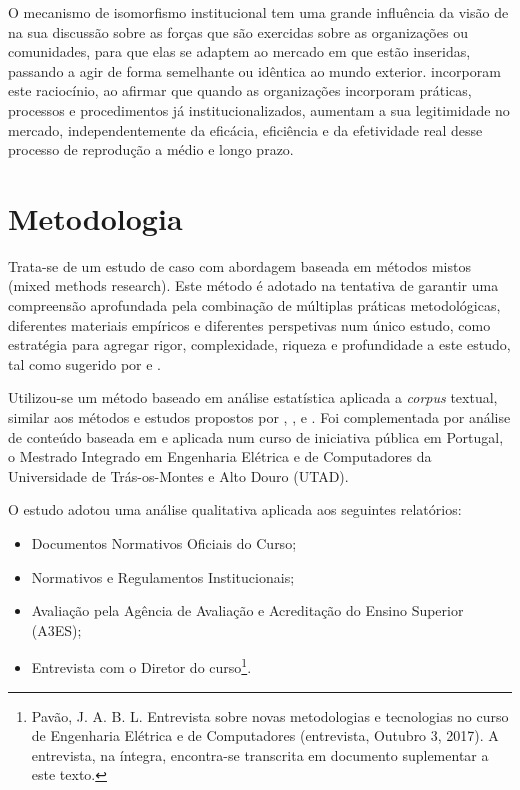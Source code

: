 \documentclass{textolivre}
\begin{document}
O mecanismo de isomorfismo institucional tem uma grande influência da visão de \textcite{kanter1972} na sua discussão sobre as forças que são exercidas sobre as organizações ou comunidades, para que elas se adaptem ao mercado em que estão inseridas, passando a agir de forma semelhante ou idêntica ao mundo exterior. \textcite{meyer1977} incorporam este raciocínio, ao afirmar que quando as organizações incorporam práticas, processos e procedimentos já institucionalizados, aumentam a sua legitimidade no mercado, independentemente da eficácia, eficiência e da efetividade real desse processo de reprodução a médio e longo prazo.

\section{Metodologia}\label{sec-metodologia}
Trata-se de um estudo de caso com abordagem baseada em métodos mistos (mixed methods research). Este método é adotado na tentativa de garantir uma compreensão aprofundada pela combinação de múltiplas práticas metodológicas, diferentes materiais empíricos e diferentes perspetivas num único estudo, como estratégia para agregar rigor, complexidade, riqueza e profundidade a este estudo, tal como sugerido por \textcite{denzin2012} e \textcite{denzin2005}.

Utilizou-se um método baseado em análise estatística aplicada a \textit{corpus} textual, similar aos métodos e estudos propostos por \textcite{lebart1994}, \textcite{marchand2012}, \textcite{reinert1983} e \textcite{reinert1990}. Foi complementada por análise de conteúdo baseada em \textcite{bardin1977} e aplicada num curso de iniciativa pública em Portugal, o Mestrado Integrado em Engenharia Elétrica e de Computadores da Universidade de Trás-os-Montes e Alto Douro (UTAD).

O estudo adotou uma análise qualitativa aplicada aos seguintes relatórios:

\begin{itemize}
\item Documentos Normativos Oficiais do Curso;
\item Normativos e Regulamentos Institucionais;
\item Avaliação pela Agência de Avaliação e Acreditação do Ensino Superior (A3ES);
\item Entrevista com o Diretor do curso\footnote{Pavão, J. A. B. L. Entrevista sobre novas metodologias e tecnologias no curso de Engenharia Elétrica e de Computadores (entrevista, Outubro 3, 2017). A entrevista, na íntegra, encontra-se transcrita em documento suplementar a este texto.}.
\end{itemize}
\end{document}
